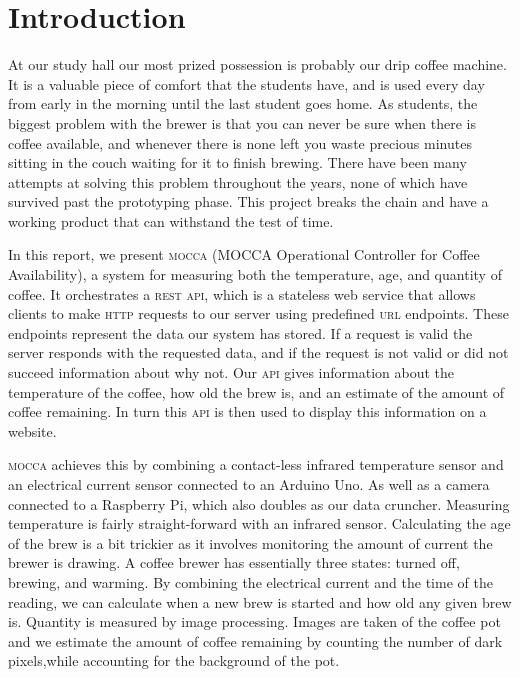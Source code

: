 \documentclass[12pt,a4paper,oneside,article]{memoir}
\numberwithin{equation}{chapter}
\begin{document}
\section{Introduction}\label{sec:introduction}
At our study hall our most prized possession is probably our drip coffee
machine. It is a valuable piece of comfort that the students have, and is used
every day from early in the morning until the last student goes home. As
students, the biggest problem with the brewer is that you can never be sure when
there is coffee available, and whenever there is none left you waste precious
minutes sitting in the couch waiting for it to finish brewing. There have been
many attempts at solving this problem throughout the years, none of which have
survived past the prototyping phase. This project breaks the chain and have a
working product that can withstand the test of time.

In this report, we present \textsc{mocca} (MOCCA Operational Controller for
Coffee Availability), a system for measuring both the temperature, age, and
quantity of coffee. It orchestrates a \textsc{rest api}, which is a stateless
web service that allows clients to make \textsc{http} requests to our server
using predefined \textsc{url} endpoints. These endpoints represent the data our
system has stored. If a request is valid the server responds with the requested
data, and if the request is not valid or did not succeed information about why
not. Our \textsc{api} gives information about the temperature of the coffee, how
old the brew is, and an estimate of the amount of coffee remaining. In turn this
\textsc{api} is then used to display this information on a website.

\textsc{mocca} achieves this by combining a contact-less infrared temperature
sensor and an electrical current sensor connected to an Arduino Uno. As well as
a camera connected to a Raspberry Pi, which also doubles as our data cruncher.
Measuring temperature is fairly straight-forward with an infrared sensor.
Calculating the age of the brew is a bit trickier as it involves monitoring the
amount of current the brewer is drawing. A coffee brewer has essentially three
states: turned off, brewing, and warming. By combining the electrical current
and the time of the reading, we can calculate when a new brew is started and how
old any given brew is. Quantity is measured by image processing. Images are
taken of the coffee pot and we estimate the amount of coffee remaining by
counting the number of dark pixels,while accounting for the background of the
pot.
\end{document}
